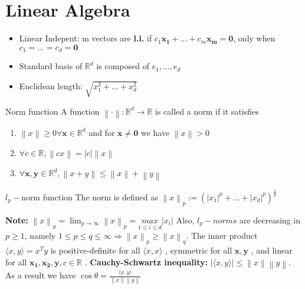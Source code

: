 \documentclass[a4paper]{article}
\begin{document}
\section{Linear Algebra}
\begin{itemize}
    \item Linear Indepent: m vectors are \textbf{l.i.} if $c_1 \mathbf{x_1} + ... + c_m\mathbf{x_m} = \mathbf{0}$, only when $c_1 = ... = c_d = \mathbf{0}$ 
    \item Standard basis of $\mathbb{R}^d$ is composed of $e_1, ..., e_d$    
    \item Euclidean length: $\sqrt{x_1^2 + \dots + x_d^2}$ 
\end{itemize}


\begin{mainbox}{Norm function}
    A function $\left\lVert \cdot \right\rVert: \mathbb{R}^d \to \mathbb{R}$ 
    is called a norm if it satisfies \begin{enumerate}
        \item $\left\lVert x\right\rVert \geq 0 \forall \mathbf{x}\in \mathbb{R}^d$ and for $\mathbf{x}\neq \mathbf{0}$ we have $\left\lVert x\right\rVert > 0$ 
        \item $\forall c \in \mathbb{R}, $$\left\lVert cx\right\rVert = |c|\left\lVert x\right\rVert $  
        \item $\forall \mathbf{x,y}\in \mathbb{R}^d, \left\lVert x+y\right\rVert \leq \left\lVert x\right\rVert + \left\lVert y\right\rVert $   
    \end{enumerate}
\end{mainbox}

\begin{subbox}{$l_p-$norm function}
    The norm is defined as $\left\lVert x\right\rVert_p := (|x_1|^p + \dots + |x_d|^p)^\frac{1}{p}$ 
\end{subbox}
\textbf{Note:} $\left\lVert x\right\rVert_p = \lim_{p\to \infty}\left\lVert x\right\rVert_p = \underset{1\leq i \leq d}{max} |x_i| $ 
\newline
Also, $l_p-norms$ are decreasing in $p\geq 1$, namely $1 \leq p \leq q \leq \infty \Rightarrow \left\lVert x\right\rVert_p \geq \left\lVert x\right\rVert_q$.
\newline
The inner product $\langle x,y \rangle = x^Ty$ is positive-definite for all $\langle x,x\rangle$ , symmetric for all $\mathbf{x,y}$ , and linear for all $\mathbf{x_1, x_2, y}, c\in\mathbb{R} $ . 
\newline
\textbf{Cauchy-Schwartz inequality: } $|\langle x,y\rangle| \leq \left\lVert x\right\rVert \left\lVert y\right\rVert$. As a result we have $\cos \theta = \frac{\langle x,y\rangle}{\left\lVert x\right\rVert\left\lVert y\right\rVert  }$   
\end{document}
